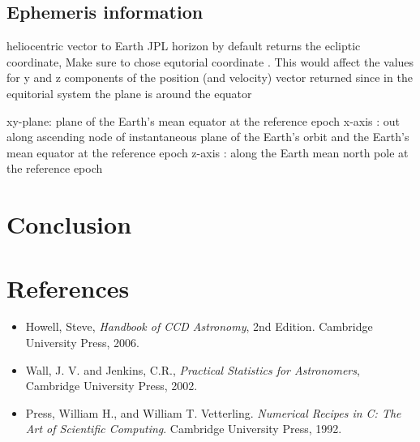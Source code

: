 \documentclass[authoryear, 12pt,5p, times]{elsarticle}
\begin{document}
	\subsection{Ephemeris information}	
heliocentric vector to Earth
	JPL horizon by default returns the ecliptic coordinate, Make sure to chose equtorial coordinate . This would affect the values for y and z components of the position (and velocity) vector returned since in the equitorial system the plane is around the equator
	
	 xy-plane: plane of the Earth's mean equator at the reference epoch
    x-axis  : out along ascending node of instantaneous plane of the Earth's
              orbit and the Earth's mean equator at the reference epoch
    z-axis  : along the Earth mean north pole at the reference epoch
    
\section{Conclusion}

 \section{References}
%
\begin{itemize}
\item Howell, Steve,  \textit{Handbook of CCD Astronomy}, 2nd Edition. Cambridge University Press, 2006.
\item Wall, J. V. and Jenkins, C.R., \textit{Practical Statistics for Astronomers}, Cambridge University Press, 2002.
\item Press, William H., and William T. Vetterling. \textit{Numerical Recipes in C: The Art of Scientific Computing}. Cambridge University Press, 1992. 
\end{itemize}
\end{document}
